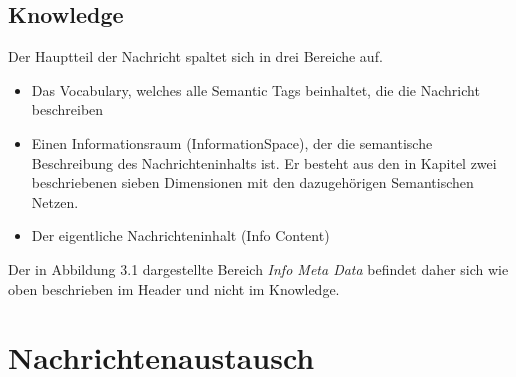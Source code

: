 \subsection{Knowledge}
Der Hauptteil der Nachricht spaltet sich in drei Bereiche auf.
\begin{itemize}
	\item Das Vocabulary, welches alle Semantic Tags beinhaltet, die die Nachricht beschreiben
	\item Einen Informationsraum (InformationSpace), der die semantische Beschreibung des Nachrichteninhalts ist. Er besteht aus den in Kapitel zwei beschriebenen sieben Dimensionen mit den dazugehörigen Semantischen Netzen.
	\item Der eigentliche Nachrichteninhalt (Info Content)	
\end{itemize}
Der in Abbildung 3.1 dargestellte Bereich \textit{Info Meta Data} befindet daher sich wie oben beschrieben im Header und nicht im Knowledge.
\section{Nachrichtenaustausch}
